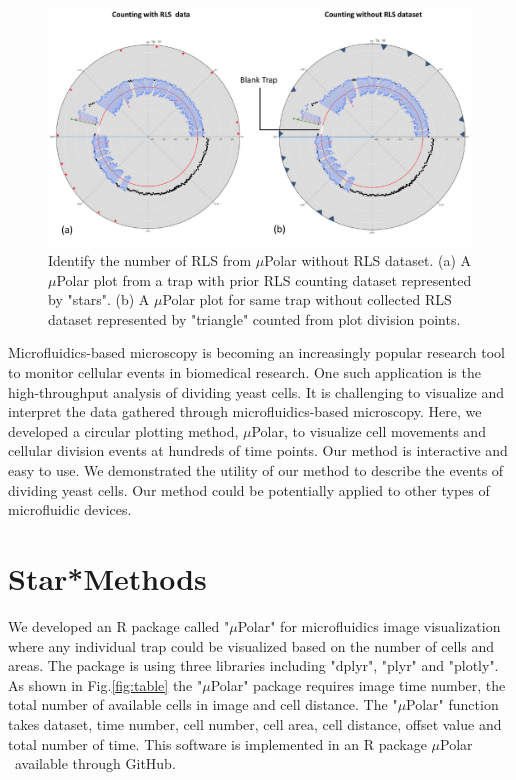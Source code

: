 \documentclass[conference]{IEEEtran}
\begin{document}
\begin{figure}
\centering
\includegraphics[width=\textwidth,height=10 cm]{Patterns/rls10.pdf}
\caption{ Identify the number of RLS from $\mu$Polar without RLS dataset. (a) A $\mu$Polar plot from a trap with prior RLS counting dataset represented by "stars". (b)  A $\mu$Polar plot for same trap without collected RLS dataset represented by "triangle" counted from plot division points.}
\label{fig:rls}
\end{figure}


Microfluidics-based microscopy is becoming an increasingly popular research tool to monitor cellular events in biomedical research. One such application is the high-throughput analysis of dividing yeast cells. It is challenging to visualize and interpret the data gathered through microfluidics-based microscopy. Here, we developed a circular plotting method, $\mu$Polar, to visualize cell movements and cellular division events at hundreds of time points. Our method is interactive and easy to use. We demonstrated the utility of our method to describe the events of dividing yeast cells. Our method could be potentially applied to other types of microfluidic devices.


\section{Star*Methods}

We developed an R package called "$\mu$Polar" for microfluidics image visualization where any individual trap could be visualized based on the number of cells and areas. The package is using three libraries including "dplyr", "plyr" and "plotly". As shown in Fig.\ref{fig:table} the "$\mu$Polar" package requires image time number, the total number of available cells in image and cell distance. The "$\mu$Polar" function takes dataset, time number, cell number, cell area, cell distance, offset value and total number of time. This software is implemented in an R package $\mu$Polar \ available through GitHub.
\end{document}
